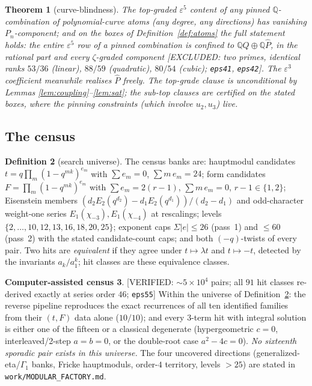 \documentclass[11pt,reqno]{amsart}
\theoremstyle{plain}
\newtheorem{theorem}{Theorem}[section]
\theoremstyle{definition}
\newtheorem{definition}[theorem]{Definition}
\newtheorem{census}[theorem]{Computer-assisted census}
\theoremstyle{remark}
\newcommand{\Q}{\mathbb{Q}}
\newcommand{\VerifiedR}[1]{\textup{\textsf{[VERIFIED: #1]}}}
\newcommand{\ExcludedR}[1]{\textup{\textsf{[EXCLUDED: #1]}}}
\begin{document}
\begin{theorem}[curve-blindness]\label{thm:blind}
The top-graded $\varepsilon^5$ content of any pinned $\Q$-combination of
polynomial-curve atoms (any degree, any directions) has vanishing
$P_n$-component; and on the boxes of Definition~\ref{def:atoms} the full
statement holds: the entire $\varepsilon^5$ row of a pinned combination is
confined to $\Q Q\oplus\Q\hat P$, in the rational part and every
$\zeta$-graded component
\ExcludedR{two primes, identical ranks $53/36$ (linear), $88/59$
(quadratic), $80/54$ (cubic); \texttt{eps41}, \texttt{eps42}}. The
$\varepsilon^3$ coefficient meanwhile realises $\hat P$ freely. The
top-grade clause is unconditional by Lemmas
\ref{lem:coupling}--\ref{lem:sat}; the sub-top clauses are certified on
the stated boxes, where the pinning constraints (which involve $u_2,u_3$)
live.
\end{theorem}

\subsection{The census}\label{sec:factory}
\begin{definition}[search universe]\label{def:universe}
The census banks are: hauptmodul candidates
$t=q\prod_m(1-q^{mk})^{e_m}$ with $\sum e_m=0$, $\sum m\,e_m=24$; form
candidates $F=\prod_m(1-q^{mk})^{e_m}$ with $\sum e_m=2(r-1)$,
$\sum m\,e_m=0$, $r-1\in\{1,2\}$; Eisenstein members
$(d_2E_2(q^{d_2})-d_1E_2(q^{d_1}))/(d_2-d_1)$ and odd-character weight-one
series $E_1(\chi_{-3}),E_1(\chi_{-4})$ at rescalings; levels
$\{2,\dots,10,12,13,16,18,20,25\}$; exponent caps $\Sigma|e|\le26$
(pass~1) and $\le60$ (pass~2) with the stated candidate-count caps; and
both $(-q)$-twists of every pair. Two hits are \emph{equivalent} if they
agree under $t\mapsto\lambda t$ and $t\mapsto-t$, detected by the
invariants $a_k/a_1^k$; hit classes are these equivalence classes.
\end{definition}

\begin{census}\label{cen:factory}
\VerifiedR{$\sim5\times10^4$ pairs; all $91$ hit classes re-derived
exactly at series order $46$; \texttt{eps55}}\quad
Within the universe of Definition~\ref{def:universe}: the reverse pipeline
reproduces the exact recurrences of all ten identified families from
their $(t,F)$ data alone ($10/10$); and every $3$-term hit with integral
solution is either one of the fifteen or a classical degenerate
(hypergeometric $c=0$, interleaved/2-step $a=b=0$, or the double-root
case $a^2-4c=0$). \emph{No sixteenth sporadic pair exists in this
universe.} The four uncovered directions (generalized-eta/$\Gamma_1$
banks, Fricke hauptmoduls, order-$4$ territory, levels $>25$) are stated
in \texttt{work/MODULAR\_FACTORY.md}.
\end{census}
\end{document}
